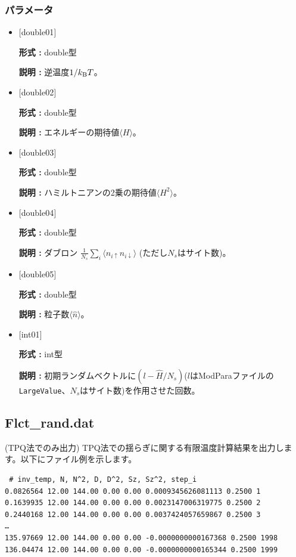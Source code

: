 \subsubsection{パラメータ}
 \begin{itemize}

  \item  $[$double01$]$
  
 {\bf 形式 :} double型

{\bf 説明 :} 逆温度$1/{k_{\rm B}T}$。
 
  \item $[$double02$]$

 {\bf 形式 :} double型 

{\bf 説明 :}  エネルギーの期待値$\langle H \rangle$。

  \item $[$double03$]$

 {\bf 形式 :} double型 

{\bf 説明 :} ハミルトニアンの2乗の期待値$\langle H^2 \rangle$。

  \item $[$double04$]$

 {\bf 形式 :} double型 

{\bf 説明 :} ダブロン
$\frac{1}{N_s} \sum_{i}\langle n_{i\uparrow}n_{i\downarrow}\rangle$ (ただし$N_s$はサイト数)。

  \item $[$double05$]$

 {\bf 形式 :} double型 

{\bf 説明 :} 粒子数$\langle {\hat n} \rangle$。


  \item $[$int01$]$

 {\bf 形式 :} int型 

{\bf 説明 :} 初期ランダムベクトルに$(l-\hat{H}/N_{s})$($l$はModParaファイルの\verb|LargeValue|、$N_{s}$はサイト数)を作用させた回数。

 \end{itemize}

\newpage
\subsection{Flct\_rand.dat}
\label{Subsec:flctrand}
(TPQ法でのみ出力) TPQ法での揺らぎに関する有限温度計算結果を出力します。以下にファイル例を示します。\\
\begin{minipage}{15cm}
\begin{screen}
\begin{verbatim}
 # inv_temp, N, N^2, D, D^2, Sz, Sz^2, step_i
0.0826564 12.00 144.00 0.00 0.00 0.0009345626081113 0.2500 1
0.1639935 12.00 144.00 0.00 0.00 0.0023147006319775 0.2500 2
0.2440168 12.00 144.00 0.00 0.00 0.0037424057659867 0.2500 3
…
135.97669 12.00 144.00 0.00 0.00 -0.0000000000167368 0.2500 1998
136.04474 12.00 144.00 0.00 0.00 -0.0000000000165344 0.2500 1999
\end{verbatim}
\end{screen}
\end{minipage}

